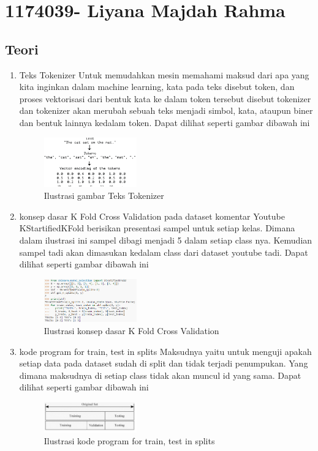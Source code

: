 \section{1174039- Liyana Majdah Rahma}
    \subsection{Teori}
    \begin{enumerate}
        \item {Teks Tokenizer}
        Untuk memudahkan mesin memahami maksud dari apa yang kita inginkan dalam machine learning, kata pada teks disebut token, dan proses vektorisasi dari bentuk kata ke dalam token tersebut disebut tokenizer dan tokenizer akan merubah sebuah teks menjadi simbol, kata, ataupun biner dan bentuk lainnya kedalam token. Dapat dilihat seperti gambar dibawah ini
        \begin{figure}[H]
            \includegraphics[width=4cm]{figures/1174039/chapter7/1.png}
            \centering
            \caption{Ilustrasi gambar Teks Tokenizer}
        \end{figure}
        
        \item {konsep dasar K Fold Cross Validation pada dataset komentar Youtube} 
        \subitem KStartifiedKFold berisikan presentasi sampel untuk setiap kelas. Dimana dalam ilustrasi ini sampel dibagi menjadi 5 dalam setiap class nya. Kemudian sampel tadi akan dimasukan kedalam class dari dataset youtube tadi. Dapat dilihat seperti gambar dibawah ini
        \begin{figure}[H]
            \includegraphics[width=4cm]{figures/1174039/chapter7/2.png}
            \centering
            \caption{Ilustrasi konsep dasar K Fold Cross Validation}
        \end{figure}
        
        \item {kode program for train, test in splits} 
        \subitem Maksudnya yaitu untuk menguji apakah setiap data pada dataset sudah di split dan tidak terjadi penumpukan. Yang dimana maksudnya di setiap class tidak akan muncul id yang sama.  Dapat dilihat seperti gambar dibawah ini
        \begin{figure}[H]
            \includegraphics[width=4cm]{figures/1174039/chapter7/3.jpeg}
            \centering
            \caption{Ilustrasi kode program for train, test in splits}
        \end{figure}
        

\end{enumerate}
